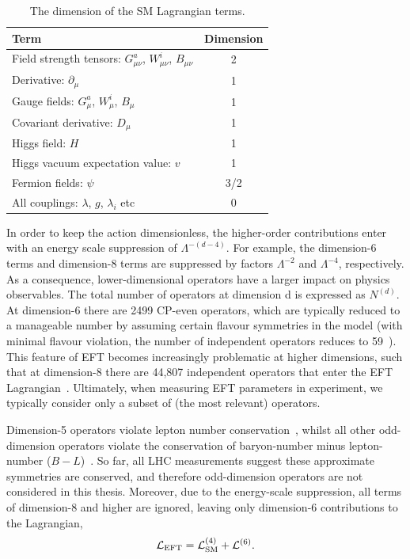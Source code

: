 \begin{table}
    \caption[Dimension of the SM Lagrangian terms]{The dimension of the SM Lagrangian terms.}
    \label{tab:dimension}
    \centering
    \footnotesize
    \setlength{\tabcolsep}{8pt}
    \renewcommand{\arraystretch}{1.2}
    \begin{tabular}{l|c}
        \hline
        Term & Dimension \\ \hline
        Field strength tensors: $G^a_{\mu\nu}$, $W^i_{\mu\nu}$, $B_{\mu\nu}$ & 2 \\
        Derivative: $\partial_\mu$ & 1 \\
        Gauge fields: $G^a_\mu$, $W^i_\mu$, $B_\mu$ & 1 \\
        Covariant derivative: $D_\mu$ & 1 \\
        Higgs field: $H$ & 1 \\
        Higgs vacuum expectation value: $v$ & 1 \\
        Fermion fields: $\psi$ & 3/2 \\
        All couplings: $\lambda$, $g$, $\lambda_i$ etc & 0 \\
        \hline
    \end{tabular}
\end{table}

In order to keep the action dimensionless, the higher-order contributions enter with an energy scale suppression of $\Lambda^{-({d}-4)}$. For example, the dimension-6 terms and dimension-8 terms are suppressed by factors $\Lambda^{-2}$ and $\Lambda^{-4}$, respectively. As a consequence, lower-dimensional operators have a larger impact on physics observables. The total number of operators at dimension d is expressed as $N^{(d)}$. At dimension-6 there are 2499 CP-even operators, which are typically reduced to a manageable number by assuming certain flavour symmetries in the model (with minimal flavour violation, the number of independent operators reduces to 59~\cite{Alonso:2013hga}). This feature of EFT becomes increasingly problematic at higher dimensions, such that at dimension-8 there are 44,807 independent operators that enter the EFT Lagrangian~\cite{Murphy:2020rsh}. Ultimately, when measuring EFT parameters in experiment, we typically consider only a subset of (the most relevant) operators.

Dimension-5 operators violate lepton number conservation~\cite{Weinberg:1979sa}, whilst all other odd-dimension operators violate the conservation of baryon-number minus lepton-number ($B-L$)~\cite{deGouvea:2014lva}. So far, all LHC measurements suggest these approximate symmetries are conserved, and therefore odd-dimension operators are not considered in this thesis. Moreover, due to the energy-scale suppression, all terms of dimension-8 and higher are ignored, leaving only dimension-6 contributions to the Lagrangian,
\begin{equation}\label{eq:eft_expansion}
    \mathcal{L}_{\rm{EFT}} = \mathcal{L}^{\rm{(4)}}_{\rm{SM}} + \mathcal{L}^{\rm{(6)}}.
\end{equation}

